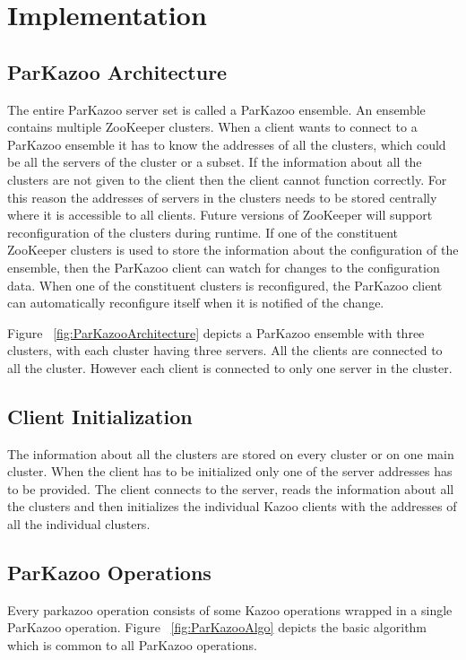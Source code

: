 \chapter{Implementation}

\section{ParKazoo Architecture}
The entire ParKazoo server set is called a ParKazoo ensemble. An ensemble contains multiple ZooKeeper clusters. When a client wants to connect to a ParKazoo ensemble it has to know the addresses of all the clusters, which could be all the servers of the cluster or a subset. If the information about all the clusters are not given to the client then the client cannot function correctly. For this reason the addresses of servers in the clusters needs to be stored centrally where it is accessible to all clients. Future versions of ZooKeeper will support reconfiguration of the clusters during runtime. If one of the constituent ZooKeeper clusters is used to store the information about the configuration of the ensemble, then the ParKazoo client can watch for changes to the configuration data. When one of the constituent clusters is reconfigured, the ParKazoo client can automatically reconfigure itself when it is notified of the change. 

\addvspace{1em}

\addvspace{1em}
Figure ~\ref{fig:ParKazooArchitecture} depicts a ParKazoo ensemble with three clusters, with each cluster having three servers. All the clients are connected to all the cluster. However each client is connected to only one server in the cluster.
  	
\section{Client Initialization}
The information about all the clusters are stored on every cluster or on one main cluster. When the client has to be initialized only one of the server addresses has to be provided. The client connects to the server, reads the information about all the clusters and then initializes the individual Kazoo clients with the addresses of all the individual clusters.

\section{ParKazoo Operations}
Every parkazoo operation consists of some Kazoo operations wrapped in a single ParKazoo operation. Figure ~\ref{fig:ParKazooAlgo} depicts the basic algorithm which is common to all ParKazoo operations.

